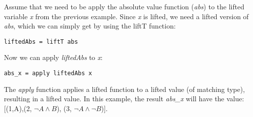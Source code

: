 \documentclass[11pt]{article} %
\begin{document}
\begin{exmp}

Assume that we need to be apply the absolute value function (\emph{abs}) to the lifted variable \emph{x} from the previous example. Since \emph{x} is lifted, we need a lifted version of \emph{abs}, which we can simply get by using the liftT function:

\begin{verbatim}
liftedAbs = liftT abs
\end{verbatim}

Now we can apply \emph{liftedAbs} to \emph{x}:

\begin{verbatim}
abs_x = apply liftedAbs x
\end{verbatim}

The \emph{apply} function applies a lifted function to a lifted value (of matching type), resulting in a lifted value. In this example, the result \emph{abs\_x} will have the value: \\

[(1,A),(2, $\neg A \wedge B$), (3, $\neg A\wedge \neg B$)].

\end{exmp}
\end{document}
